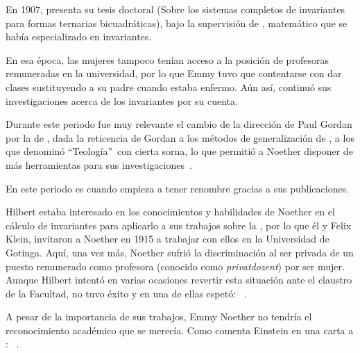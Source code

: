 En 1907, presenta su tesis doctoral  (Sobre los sistemas completos de invariantes para formas ternarias bicuadráticas), bajo la supervisión de , matemático que se había especializado en invariantes.

En esa época, las mujeres tampoco tenían acceso a la posición de profesoras remuneradas en la universidad, por lo que Emmy tuvo que contentarse con dar clases sustituyendo a su padre cuando estaba enfermo.
Aún así, continuó sus investigaciones acerca de los invariantes por su cuenta.

Durante este periodo fue muy relevante el cambio de la dirección de Paul Gordan por la de , dada la reticencia de Gordan a los métodos de generalización de , a los que denominó \textquotedblleft Teología\textquotedblright\ con cierta sorna, lo que permitió a Noether disponer de más herramientas para sus investigaciones~\cite{Weyl}.

En este periodo es cuando empieza a tener renombre gracias a sus publicaciones.

Hilbert estaba interesado en los conocimientos y habilidades de Noether en el cálculo de invariantes para aplicarlo a sus trabajos sobre la ,
por lo que él y Felix Klein, invitaron a Noether en 1915 a trabajar con ellos en la Universidad de Gotinga.
Aquí, una vez más, Noether sufrió la discriminación al ser privada de un puesto remunerado como profesora (conocido como \textit{privatdozent}) por ser mujer.
Aunque Hilbert intentó en varias ocasiones revertir esta situación ante el claustro de la Facultad, no tuvo éxito y en una de ellas espetó: ~\autocite[332]{Carrasco}.

A pesar de la importancia de sus trabajos, Emmy Noether no tendría el reconocimiento académico que se merecía.
Como comenta Einstein en una carta a : ~\cite{Kimberling}.

